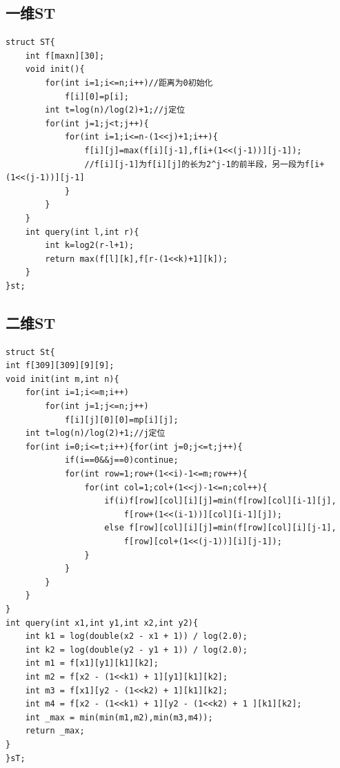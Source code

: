 \documentclass[12pt, a4paper, oneside]{ctexart}
\begin{document}
\newpage
\subsection{一维ST} 
\begin{lstlisting}
struct ST{
	int f[maxn][30];
	void init(){
		for(int i=1;i<=n;i++)//距离为0初始化 
			f[i][0]=p[i];
		int t=log(n)/log(2)+1;//j定位 
		for(int j=1;j<t;j++){
			for(int i=1;i<=n-(1<<j)+1;i++){
				f[i][j]=max(f[i][j-1],f[i+(1<<(j-1))][j-1]);
				//f[i][j-1]为f[i][j]的长为2^j-1的前半段，另一段为f[i+(1<<(j-1))][j-1] 
			}
		} 
	}
	int query(int l,int r){
		int k=log2(r-l+1);
		return max(f[l][k],f[r-(1<<k)+1][k]);
	}
}st;
\end{lstlisting}

\newpage
\subsection{二维ST} 
\begin{lstlisting}
struct St{
int f[309][309][9][9];
void init(int m,int n){
	for(int i=1;i<=m;i++)
		for(int j=1;j<=n;j++)
			f[i][j][0][0]=mp[i][j];
	int t=log(n)/log(2)+1;//j定位 
	for(int i=0;i<=t;i++){for(int j=0;j<=t;j++){
            if(i==0&&j==0)continue;
            for(int row=1;row+(1<<i)-1<=m;row++){
                for(int col=1;col+(1<<j)-1<=n;col++){
                    if(i)f[row][col][i][j]=min(f[row][col][i-1][j],
                    	f[row+(1<<(i-1))][col][i-1][j]);
                    else f[row][col][i][j]=min(f[row][col][i][j-1],
                    	f[row][col+(1<<(j-1))][i][j-1]);
                }
            }
        }
    }
}
int query(int x1,int y1,int x2,int y2){
    int k1 = log(double(x2 - x1 + 1)) / log(2.0);
    int k2 = log(double(y2 - y1 + 1)) / log(2.0);
    int m1 = f[x1][y1][k1][k2];
    int m2 = f[x2 - (1<<k1) + 1][y1][k1][k2];
    int m3 = f[x1][y2 - (1<<k2) + 1][k1][k2];
    int m4 = f[x2 - (1<<k1) + 1][y2 - (1<<k2) + 1 ][k1][k2];
    int _max = min(min(m1,m2),min(m3,m4));
    return _max;
}
}sT;
\end{lstlisting}

\newpage
\end{document}

